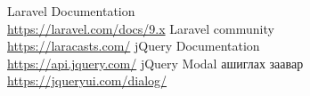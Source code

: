 
\singlespace
{}
\begin{thebibliography}{99}
	Laravel Documentation
	\\\url{https://laravel.com/docs/9.x}
	Laravel community
	\\\url{https://laracasts.com/}
	jQuery Documentation
	\\\url{https://api.jquery.com/}
	jQuery Modal ашиглах заавар
	\\\url{https://jqueryui.com/dialog/}
\end{thebibliography}
